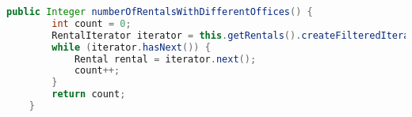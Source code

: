 \begin{lstlisting}[style = javaNormal, language=Java] 
    public Integer numberOfRentalsWithDifferentOffices() {
        int count = 0;
        RentalIterator iterator = this.getRentals().createFilteredIterator();
        while (iterator.hasNext()) {
            Rental rental = iterator.next();
            count++;
        }
        return count;
    }
\end{lstlisting}
\vspace{0.20cm}